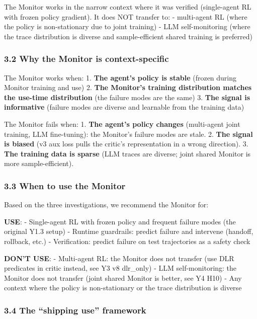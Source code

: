 \documentclass[
]{article}
\begin{document}
The Monitor works in the narrow context where it was verified
(single-agent RL with frozen policy gradient). It does NOT transfer to:
- multi-agent RL (where the policy is non-stationary due to joint
training) - LLM self-monitoring (where the trace distribution is diverse
and sample-efficient shared training is preferred)

\subsubsection{3.2 Why the Monitor is
context-specific}\label{why-the-monitor-is-context-specific}

The Monitor works when: 1. \textbf{The agent's policy is stable} (frozen
during Monitor training and use) 2. \textbf{The Monitor's training
distribution matches the use-time distribution} (the failure modes are
the same) 3. \textbf{The signal is informative} (failure modes are
diverse and learnable from the training data)

The Monitor fails when: 1. \textbf{The agent's policy changes}
(multi-agent joint training, LLM fine-tuning): the Monitor's failure
modes are stale. 2. \textbf{The signal is biased} (v3 aux loss pulls the
critic's representation in a wrong direction). 3. \textbf{The training
data is sparse} (LLM traces are diverse; joint shared Monitor is more
sample-efficient).

\subsubsection{3.3 When to use the
Monitor}\label{when-to-use-the-monitor}

Based on the three investigations, we recommend the Monitor for:

\textbf{USE}: - Single-agent RL with frozen policy and frequent failure
modes (the original Y1.3 setup) - Runtime guardrails: predict failure
and intervene (handoff, rollback, etc.) - Verification: predict failure
on test trajectories as a safety check

\textbf{DON'T USE}: - Multi-agent RL: the Monitor does not transfer (use
DLR predicates in critic instead, see Y3 v8 dlr\_only) - LLM
self-monitoring: the Monitor does not transfer (joint shared Monitor is
better, see Y4 H10) - Any context where the policy is non-stationary or
the trace distribution is diverse

\subsubsection{3.4 The ``shipping use''
framework}\label{the-shipping-use-framework}
\end{document}
